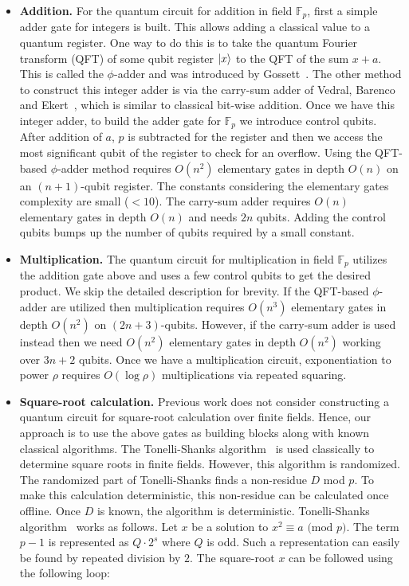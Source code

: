 \begin{itemize}
    \item \textbf{Addition.} For the quantum circuit for addition in field $\mathbb{F}_p$, first a simple adder gate for integers is built. This allows adding a classical value to a quantum register. One way to do this is to take the quantum Fourier transform (QFT) of some qubit register $\ket{x}$ to the QFT of the sum $x + a$. This is called the $\phi$-adder and was introduced by Gossett~\cite{quantumCarrySave}. The other method to construct this integer adder is via the carry-sum adder of Vedral, Barenco and Ekert~\cite{Vedral_Barenco_Ekert_1996}, which is similar to classical bit-wise addition. Once we have this integer adder, to build the adder gate for $\mathbb{F}_p$ we introduce control qubits. After addition of $a$, $p$ is subtracted for the register and then we access the most significant qubit of the register to check for an overflow. Using the QFT-based $\phi$-adder method requires $O(n^2)$ elementary gates in depth $O(n)$ on an $(n+1)$-qubit register. The constants considering the elementary gates complexity are small ($<10$). The carry-sum adder requires $O(n)$ elementary gates in depth $O(n)$ and needs $2n$ qubits.  Adding the control qubits bumps up the number of qubits required by a small constant. 

\item \textbf{Multiplication.} The quantum circuit for multiplication in field $\mathbb{F}_p$ utilizes the addition gate above and uses a few control qubits to get the desired product. We skip the detailed description for brevity. If the QFT-based $\phi$-adder are utilized then multiplication requires $O(n^3)$ elementary gates in depth $O(n^2)$ on $(2n+3)$-qubits. However, if the carry-sum adder is used instead then we need $O(n^2)$ elementary gates in depth $O(n^2)$ working over $3n+2$ qubits. Once we have a multiplication circuit, exponentiation to power $\rho$ requires $O(\log \rho)$ multiplications via repeated squaring.


\item \textbf{Square-root calculation.} Previous work does not consider constructing a quantum circuit for square-root calculation over finite fields. Hence, our approach is to use the above gates as building blocks along with known classical algorithms. The Tonelli-Shanks algorithm~\cite{Shanks} is used classically to determine square roots in finite fields. However, this algorithm is randomized. The randomized part of Tonelli-Shanks finds a non-residue $D$ mod $p$. To make this calculation deterministic, this non-residue can be calculated once offline. Once $D$ is known, the algorithm is deterministic. Tonelli-Shanks algorithm~\cite{Shanks} works as follows. Let $x$ be a solution to $x^2 \equiv a \text{ (mod } p)$. The term $p-1$ is represented as $Q\cdot2^{s}$ where $Q$ is odd. Such a representation can easily be found by repeated division by $2$. The square-root $x$ can be followed using the following loop:


\end{itemize}

